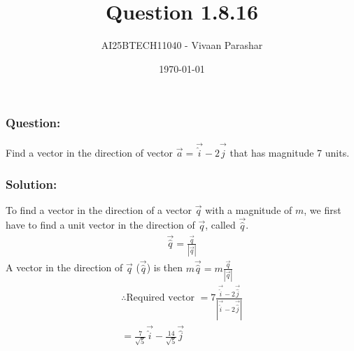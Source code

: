 \documentclass{beamer}
\title{Question 1.8.16}
\author{AI25BTECH11040 - Vivaan Parashar}
\date{\today}
\begin{document}
\frame{\titlepage}

\begin{frame}
    \frametitle{Question: }
    Find a vector in the direction of vector $\vec{a} = \vec{\hat{i}} - 2\vec{\hat{j}}$ that has magnitude 7 units.
\end{frame}

\begin{frame}
    \frametitle{Solution: }
    To find a vector in the direction of a vector $\vec{q}$ with a magnitude of $m$, we first have to find a unit vector in the direction of $\vec{q}$, called $\vec{\hat{q}}$.
    \begin{align}
        \vec{\hat{q}} = \frac{\vec{q}}{|\vec{q}|}
    \end{align}
    A vector in the direction of $\vec{q}$ ($\vec{\hat{q}}$) is then $m \vec{\hat{q}} = m\frac{\vec{q}}{|\vec{q}|}$
    \begin{align}
        \therefore \text{Required vector } = 7\frac{\vec{\hat{i}} - 2\vec{\hat{j}}}{|\vec{\hat{i}} - 2\vec{\hat{j}}|} \\
        = \frac{7}{\sqrt{5}}\vec{\hat{i}} - \frac{14}{\sqrt{5}}\vec{\hat{j}}
    \end{align}
\end{frame}
\end{document}
